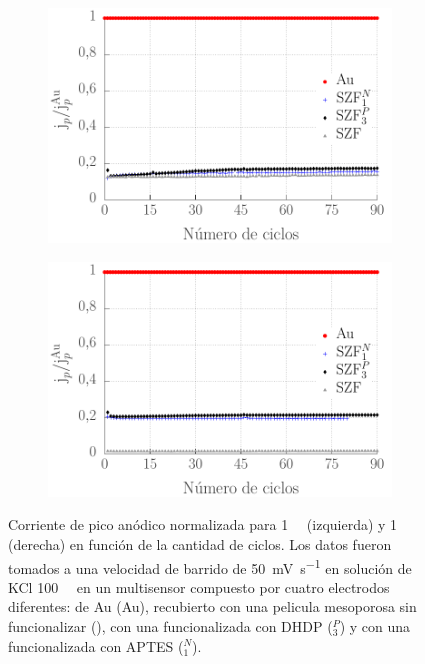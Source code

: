 		\begin{figure}[b!]
		 	\begin{subfigure}[t]{0.495\textwidth}
		 	  \includegraphics[width=\textwidth]{Graficos/ciclosintferroceno.pdf}
		      \end{subfigure}
			\begin{subfigure}[t]{0.495\textwidth}
		 	    \includegraphics[width=\textwidth]{Graficos/ciclosintfecn.pdf}
			\end{subfigure}
		      	\caption[Corriente de pico de \fc\space y \fe\space en función del número de ciclos]{Corriente de pico anódico normalizada para \fc\space \SI{1}{\milli\Molar} (izquierda) y  \fe\space \SI{1}{\milli\Molar} (derecha) en función de la cantidad de ciclos. Los datos fueron tomados a una velocidad de barrido de \SI{50}{\milli\volt\per\second} en solución de KCl \SI{100}{\milli\Molar} en un multisensor compuesto por cuatro electrodos diferentes: de Au (Au), recubierto con una pelicula mesoporosa sin funcionalizar (\pdmZ), con una funcionalizada con DHDP (\pdmZ$^P_3$) y con una funcionalizada con APTES (\pdmZ$^N_1$).}
		      	\label{fig:ciclos-fe-fcoh}
		      	\end{figure}
		     		
